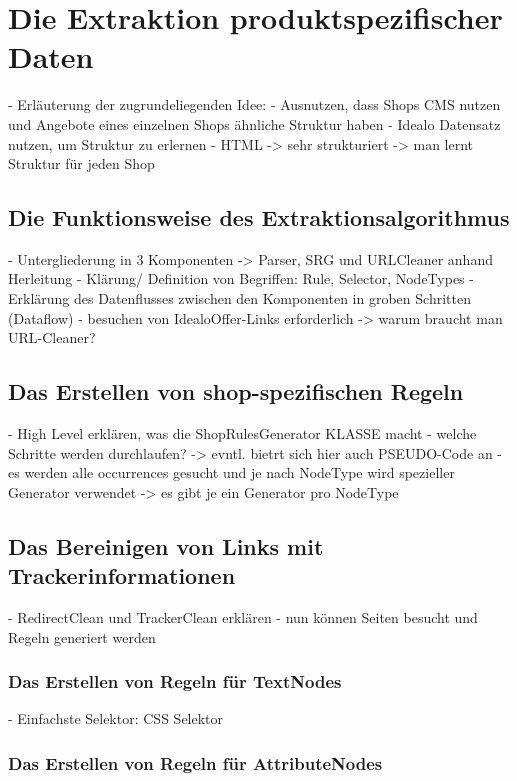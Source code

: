 \section{Die Extraktion produktspezifischer Daten}

- Erläuterung der zugrundeliegenden Idee:
	- Ausnutzen, dass Shops CMS nutzen und Angebote eines einzelnen Shops ähnliche Struktur haben
	- Idealo Datensatz nutzen, um Struktur zu erlernen
	- HTML -> sehr strukturiert -> man lernt Struktur für jeden Shop
\subsection{Die Funktionsweise des Extraktionsalgorithmus}

	- Untergliederung in 3 Komponenten -> Parser, SRG und URLCleaner anhand Herleitung
	- Klärung/ Definition von Begriffen: Rule, Selector, NodeTypes
	- Erklärung des Datenflusses zwischen den Komponenten in groben Schritten (Dataflow)
	- besuchen von IdealoOffer-Links erforderlich -> warum braucht man URL-Cleaner?
	
\subsection{Das Erstellen von shop-spezifischen Regeln}

	- High Level erklären, was die ShopRulesGenerator KLASSE macht
	- welche Schritte werden durchlaufen? -> evntl. bietrt sich hier auch PSEUDO-Code an
	- es werden alle occurrences gesucht und je nach NodeType wird spezieller Generator verwendet
	-> es gibt je ein Generator pro NodeType	
	
\subsection{Das Bereinigen von Links mit Trackerinformationen}
	- RedirectClean und TrackerClean erklären
	- nun können Seiten besucht und Regeln generiert werden	
	
\subsubsection{Das Erstellen von Regeln für TextNodes}

	- Einfachste Selektor: CSS Selektor

\subsubsection{Das Erstellen von Regeln für AttributeNodes}

